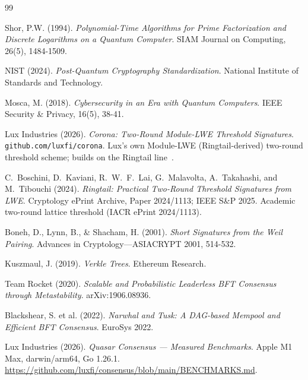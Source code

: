 \begin{thebibliography}{99}

Shor, P.W. (1994).
\textit{Polynomial-Time Algorithms for Prime Factorization and Discrete Logarithms on a Quantum Computer}.
SIAM Journal on Computing, 26(5), 1484-1509.

NIST (2024).
\textit{Post-Quantum Cryptography Standardization}.
National Institute of Standards and Technology.

Mosca, M. (2018).
\textit{Cybersecurity in an Era with Quantum Computers}.
IEEE Security \& Privacy, 16(5), 38-41.

{Lux Industries} (2026).
\textit{Corona: Two-Round Module-LWE Threshold Signatures}.
\texttt{github.com/luxfi/corona}.
Lux's own Module-LWE (Ringtail-derived) two-round threshold scheme;
builds on the Ringtail line~\cite{ringtail}.

C.~Boschini, D.~Kaviani, R.~W.~F.~Lai, G.~Malavolta, A.~Takahashi, and
M.~Tibouchi (2024).
\textit{Ringtail: Practical Two-Round Threshold Signatures from LWE}.
Cryptology ePrint Archive, Paper 2024/1113; IEEE S\&P 2025.
Academic two-round lattice threshold (IACR ePrint 2024/1113).

Boneh, D., Lynn, B., \& Shacham, H. (2001).
\textit{Short Signatures from the Weil Pairing}.
Advances in Cryptology---ASIACRYPT 2001, 514-532.

Kuszmaul, J. (2019).
\textit{Verkle Trees}.
Ethereum Research.

Team Rocket (2020).
\textit{Scalable and Probabilistic Leaderless BFT Consensus through Metastability}.
arXiv:1906.08936.

Blackshear, S. et al. (2022).
\textit{Narwhal and Tusk: A DAG-based Mempool and Efficient BFT Consensus}.
EuroSys 2022.

Lux Industries (2026).
\textit{Quasar Consensus --- Measured Benchmarks}.
Apple M1 Max, darwin/arm64, Go 1.26.1.
\url{https://github.com/luxfi/consensus/blob/main/BENCHMARKS.md}.

\end{thebibliography}

\appendix

